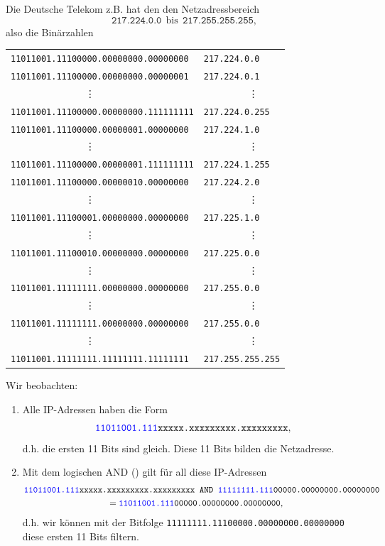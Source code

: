 Die Deutsche Telekom z.B. hat den den Netzadressbereich
$$\texttt{217.224.0.0}~~\text{bis}~~\texttt{217.255.255.255},$$
also die Binärzahlen
\begin{center}
	\begin{tabular}{ll}
\texttt{{\color{blue}11011001.111}00000.00000000.00000000} & \texttt{217.224.0.0} \\
\texttt{{\color{blue}11011001.111}00000.00000000.00000001} & \texttt{217.224.0.1} \\
~~~~~~~~~~~~~~~\vdots &~~~~~~~~~\vdots \\
\texttt{{\color{blue}11011001.111}00000.00000000.111111111} & \texttt{217.224.0.255}\\
\texttt{{\color{blue}11011001.111}00000.00000001.00000000}  & \texttt{217.224.1.0} \\
~~~~~~~~~~~~~~~\vdots &~~~~~~~~~\vdots \\
\texttt{{\color{blue}11011001.111}00000.00000001.111111111} & \texttt{217.224.1.255}\\
\texttt{{\color{blue}11011001.111}00000.00000010.00000000} & \texttt{217.224.2.0}\\
~~~~~~~~~~~~~~~\vdots &~~~~~~~~~\vdots \\
\texttt{{\color{blue}11011001.111}00001.00000000.00000000} & \texttt{217.225.1.0}\\
~~~~~~~~~~~~~~~\vdots &~~~~~~~~~\vdots \\
\texttt{{\color{blue}11011001.111}00010.00000000.00000000} & \texttt{217.225.0.0}\\
~~~~~~~~~~~~~~~\vdots &~~~~~~~~~\vdots \\
\texttt{{\color{blue}11011001.111}11111.00000000.00000000} & \texttt{217.255.0.0}\\
~~~~~~~~~~~~~~~\vdots &~~~~~~~~~\vdots \\
\texttt{{\color{blue}11011001.111}11111.00000000.00000000} & \texttt{217.255.0.0}\\
~~~~~~~~~~~~~~~\vdots &~~~~~~~~~\vdots \\
\texttt{{\color{blue}11011001.111}11111.11111111.11111111} & \texttt{217.255.255.255}\\
\end{tabular}
\end{center}
Wir beobachten:
\begin{enumerate}
	\item Alle IP-Adressen haben die Form
	 $$\texttt{{\color{blue}11011001.111}xxxxx.xxxxxxxxx.xxxxxxxxx},$$
	 d.h. die ersten 11 Bits sind gleich. Diese 11 Bits bilden die Netzadresse.
	\item Mit dem logischen AND () gilt für all diese IP-Adressen
	\begin{align*}
\texttt{{\color{blue}11011001.111}xxxxx.}&\texttt{xxxxxxxxx.xxxxxxxxx~AND~{\color{blue}11111111.111}00000.00000000.00000000} \\
&= \texttt{{\color{blue}11011001.111}00000.00000000.00000000},
\end{align*}
d.h. wir können mit der Bitfolge \texttt{{\color{blue}11111111.111}00000.00000000.00000000} diese ersten 11 Bits filtern.
\end{enumerate}
